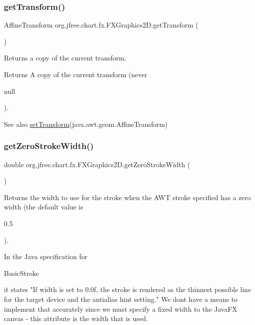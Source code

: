 \subsubsection{\texorpdfstring{get\+Transform()}{getTransform()}}
{\footnotesize\ttfamily Affine\+Transform org.\+jfree.\+chart.\+fx.\+F\+X\+Graphics2\+D.\+get\+Transform (\begin{DoxyParamCaption}{ }\end{DoxyParamCaption})}

Returns a copy of the current transform.

\begin{DoxyReturn}{Returns}
A copy of the current transform (never
\begin{DoxyCode}
null 
\end{DoxyCode}
 ).
\end{DoxyReturn}
\begin{DoxySeeAlso}{See also}
\mbox{\hyperlink{classorg_1_1jfree_1_1chart_1_1fx_1_1_f_x_graphics2_d_a9d5c4e160b2037726b9cbc3b6e6f2d52}{set\+Transform}}(java.\+awt.\+geom.\+Affine\+Transform) 
\end{DoxySeeAlso}
\mbox{\label{classorg_1_1jfree_1_1chart_1_1fx_1_1_f_x_graphics2_d_acdb61714e29614a33ff3a4900714eb3f}} 
\subsubsection{\texorpdfstring{get\+Zero\+Stroke\+Width()}{getZeroStrokeWidth()}}
{\footnotesize\ttfamily double org.\+jfree.\+chart.\+fx.\+F\+X\+Graphics2\+D.\+get\+Zero\+Stroke\+Width (\begin{DoxyParamCaption}{ }\end{DoxyParamCaption})}

Returns the width to use for the stroke when the A\+WT stroke specified has a zero width (the default value is
\begin{DoxyCode}
0.5 
\end{DoxyCode}
 ). 

In the Java specification for
\begin{DoxyCode}
BasicStroke 
\end{DoxyCode}
 it states "If width is set to 0.\+0f, the stroke is rendered as the thinnest possible line for the target device and the antialias hint setting." We don\textquotesingle{}t have a means to implement that accurately since we must specify a fixed width to the Java\+FX canvas -\/ this attribute is the width that is used.


